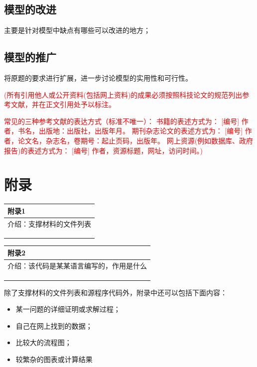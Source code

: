 \documentclass{my_paper}
\begin{document}
\subsection{模型的改进}
主要是针对模型中缺点有哪些可以改进的地方\cite{risken1996fokker}；
\subsection{模型的推广}
将原题的要求进行扩展\cite{rossler1979equation}，进一步讨论模型的实用性和可行性\cite{mckean1970nagumo}。

\begin{center}
\end{center}
\textcolor{red}{(所有引用他人或公开资料(包括网上资料)的成果必须按照科技论文的规范列出参考文献，并在正文引用处予以标注。}

\textcolor{red}{常见的三种参考文献的表达方式（标准不唯一）：
书籍的表述方式为： [编号] 作者，书名，出版地：出版社，出版年月。
期刊杂志论文的表述方式为： [编号] 作者，论文名，杂志名，卷期号：起止页码，出版年。
网上资源(例如数据库、政府报告)的表述方式为： [编号] 作者，资源标题，网址，访问时间。)}
\newpage
\section{附录}

\begin{table}[htbp]
    \centering
    \begin{tabular}{|p{14.0cm}|}
    \hline
    \textbf{附录1} \\ %
    \hline
    介绍：支撑材料的文件列表  \\ 
    \\
    \\
    \\
    \hline
    \end{tabular}
\end{table}

\begin{table}[htbp]
    \centering
    \begin{tabular}{|p{14.0cm}|}
    \hline
    \textbf{附录2} \\ %
    \hline
    介绍：该代码是某某语言编写的，作用是什么   \\ 
    \\
    \\
    \\
    \hline
    \end{tabular}
\end{table}

除了支撑材料的文件列表和源程序代码外，附录中还可以包括下面内容：
\begin{itemize}
\item 某一问题的详细证明或求解过程；
\item 自己在网上找到的数据；
\item 比较大的流程图；
\item 较繁杂的图表或计算结果
\end{itemize}
\end{document}
